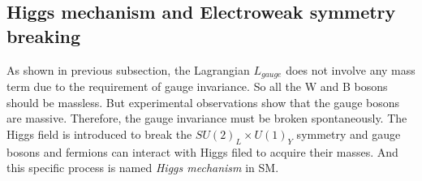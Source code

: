 \subsection{Higgs mechanism and Electroweak symmetry breaking}
\label{symbreaking}

As shown in previous subsection, the Lagrangian $L_{gauge}$ does not involve any mass term due to the requirement of gauge invariance.
So all the W and B bosons should be massless. But experimental observations show that the gauge bosons are massive.
Therefore, the gauge invariance must be broken spontaneously.
The Higgs field is introduced to break the $SU(2)_{L} \times U(1)_{Y}$ symmetry and
gauge bosons and fermions can interact with Higgs filed to acquire their masses.
And this specific process is named \textit{Higgs mechanism} in SM.

